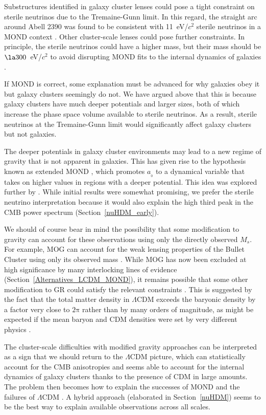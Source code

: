 \documentclass[fleqn,usenatbib,useAMS,onecolumn]{mnras} %
\begin{document}
Substructures identified in galaxy cluster lenses could pose a tight constraint on sterile neutrinos due to the Tremaine-Gunn limit. In this regard, the straight arc around Abell 2390 was found to be consistent with 11~eV/$c^2$ sterile neutrinos in a MOND context \citep{Feix_2010}. Other cluster-scale lenses could pose further constraints. In principle, the sterile neutrinos could have a higher mass, but their mass should be $\la 300$~eV/$c^2$ to avoid disrupting MOND fits to the internal dynamics of galaxies \citep{Angus_2010_minimum_neutrino_mass}.

If MOND is correct, some explanation must be advanced for why galaxies obey it but galaxy clusters seemingly do not. We have argued above that this is because galaxy clusters have much deeper potentials and larger sizes, both of which increase the phase space volume available to sterile neutrinos. As a result, sterile neutrinos at the Tremaine-Gunn limit would significantly affect galaxy clusters but not galaxies.

The deeper potentials in galaxy cluster environments may lead to a new regime of gravity that is not apparent in galaxies. This has given rise to the hypothesis known as extended MOND \citep[EMOND;][]{Zhao_2012}, which promotes $a_{_0}$ to a dynamical variable that takes on higher values in regions with a deeper potential. This idea was explored further by \citet{Hodson_2017_EMOND}. While initial results were somewhat promising, we prefer the sterile neutrino interpretation because it would also explain the high third peak in the CMB power spectrum (Section~\ref{nuHDM_early}).

We should of course bear in mind the possibility that some modification to gravity can account for these observations using only the directly observed $M_s$. For example, MOG can account for the weak lensing properties of the Bullet Cluster using only its observed mass \citep{Brownstein_2007}. While MOG has now been excluded at high significance by many interlocking lines of evidence (Section~\ref{Alternatives_LCDM_MOND}), it remains possible that some other modification to GR could satisfy the relevant constraints \citep[e.g.][]{Acedo_2017}. This is suggested by the fact that the total matter density in $\Lambda$CDM exceeds the baryonic density by a factor very close to $2\mathrm{\pi}$ rather than by many orders of magnitude, as might be expected if the mean baryon and CDM densities were set by very different physics \citep{Milgrom_2020_history}.

The cluster-scale difficulties with modified gravity approaches can be interpreted as a sign that we should return to the $\Lambda$CDM picture, which can statistically account for the CMB anisotropies \citep{Planck_2020} and seems able to account for the internal dynamics of galaxy clusters thanks to the presence of CDM in large amounts. The problem then becomes how to explain the successes of MOND \citep[e.g.][]{Famaey_McGaugh_2012, Lelli_2017, Shelest_2020} and the failures of $\Lambda$CDM \citep[e.g.][]{Kroupa_2012, Kroupa_2015, Peebles_2020}. A hybrid approach (elaborated in Section~\ref{nuHDM}) seems to be the best way to explain available observations across all scales.
\end{document}
